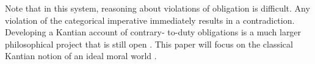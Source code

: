 \begin{isabellebody}
\begin{isamarkuptext}
Note that in this system, reasoning about violations of obligation is difficult. Any violation of the 
categorical imperative immediately results in a contradiction. Developing a Kantian account of contrary-
to-duty obligations is a much larger philosophical project that is still open \cite{KorsgaardRTL}. This paper will focus 
on the classical Kantian notion of an ideal moral world \cite{idealtheory}.%
\end{isamarkuptext}\isamarkuptrue%
%
\isadelimdocument
%
\endisadelimdocument
%
\isatagdocument
%
\endisatagdocument
{\isafolddocument}%
%
\isadelimdocument
%
\endisadelimdocument
%
\isadelimproof
%
\endisadelimproof
%
\isatagproof
%
\endisatagproof
{\isafoldproof}%
%
\isadelimproof
%
\endisadelimproof
%
\isadelimproof
%
\endisadelimproof
%
\isatagproof
%
\endisatagproof
{\isafoldproof}%
%
\isadelimproof
%
\endisadelimproof
%
\isadelimproof
%
\endisadelimproof
%
\isatagproof
%
\endisatagproof
{\isafoldproof}%
%
\isadelimproof
%
\endisadelimproof
%
\isadelimproof
%
\endisadelimproof
%
\isatagproof
%
\endisatagproof
{\isafoldproof}%
%
\isadelimproof
%
\endisadelimproof
%
\isadelimproof
%
\endisadelimproof
%
\isatagproof
%
\endisatagproof
{\isafoldproof}%
%
\isadelimproof
%
\endisadelimproof
%
\isadelimdocument
%
\endisadelimdocument
%
\isatagdocument
%
\endisatagdocument
{\isafolddocument}%
%
\isadelimdocument
%
\endisadelimdocument
%
\isadelimproof
%
\endisadelimproof
%
\isatagproof
%
\endisatagproof
{\isafoldproof}%
%
\isadelimproof
%
\endisadelimproof
%
\isadelimproof
%
\endisadelimproof
%
\isatagproof
%
\endisatagproof
{\isafoldproof}%
%
\isadelimproof
%
\endisadelimproof
%
\isadelimproof
%
\endisadelimproof
%
\isatagproof
%
\endisatagproof
{\isafoldproof}%
%
\isadelimproof
%
\endisadelimproof
%
\isadelimproof
%
\endisadelimproof
%
\isatagproof
%
\endisatagproof
{\isafoldproof}%
%
\isadelimproof
%
\endisadelimproof
%
\isadelimdocument
%
\endisadelimdocument
%
\isatagdocument
%
\endisatagdocument
{\isafolddocument}%
%
\isadelimdocument
%
\endisadelimdocument
%
\isadelimproof
%
\endisadelimproof
%
\isatagproof
%
\endisatagproof
{\isafoldproof}%
%
\isadelimproof
%
\endisadelimproof
%
\isadelimproof
%
\endisadelimproof
%
\isatagproof
%
\endisatagproof
{\isafoldproof}%
%
\isadelimproof
%
\endisadelimproof
%
\isadelimdocument
%
\endisadelimdocument
%
\isatagdocument
%
\endisatagdocument
{\isafolddocument}%
%
\isadelimdocument
%
\endisadelimdocument
%
\isadelimproof
%
\endisadelimproof
%
\isatagproof
%
\endisatagproof
{\isafoldproof}%
%
\isadelimproof
%
\endisadelimproof
%
\isadelimproof
%
\endisadelimproof
%
\isatagproof

\end{isabellebody}
